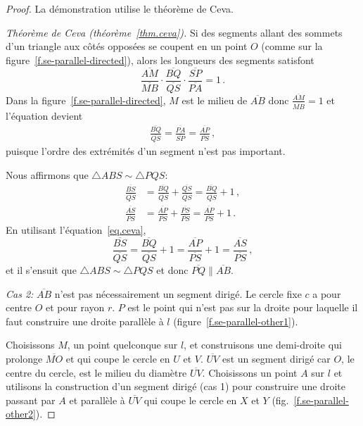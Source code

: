 \begin{proof}
La démonstration utilise le théorème de Ceva.

\textit{Théorème de Ceva   (théorème~\ref{thm.ceva}).} Si des segments  allant des sommets d'un triangle aux côtés opposées se coupent en un point $O$ (comme sur la figure~\ref{f.se-parallel-directed}), alors les longueurs des segments satisfont 
\[
\frac{\overline{AM}}{\overline{MB}}\cdot\frac{\overline{BQ}}{\overline{QS}}\cdot\frac{\overline{SP}}{\overline{PA}} = 1\,.
\]
Dans la figure~\ref{f.se-parallel-directed}, $M$ est le milieu de $\overline{AB}$ donc 
 $\displaystyle\frac{\overline{AM}}{\overline{MB}}=1$ et l'équation devient 
\begin{align}
\frac{\overline{BQ}}{\overline{QS}}=\frac{\overline{PA}}{\overline{SP}}=\frac{\overline{AP}}{\overline{PS}}\,,\label{eq.ceva}
\end{align}
puisque l'ordre des extrémités d'un segment n'est pas important.

Nous affirmons que $\triangle ABS \sim \triangle PQS$:
\begin{align*}
\frac{\overline{BS}}{\overline{QS}}&=\frac{\overline{BQ}}{\overline{QS}}+\frac{\overline{QS}}{\overline{QS}} = \frac{\overline{BQ}}{\overline{QS}}+1\,,\\
\frac{\overline{AS}}{\overline{PS}} &= \frac{\overline{AP}}{\overline{PS}} + \frac{\overline{PS}}{\overline{PS}} = \frac{\overline{AP}}{\overline{PS}} + 1\,.
\end{align*}
En utilisant l'équation~\ref{eq.ceva},
\[
\frac{\overline{BS}}{\overline{QS}}=\frac{\overline{BQ}}{\overline{QS}}+1=\frac{\overline{AP}}{\overline{PS}}+1=\frac{\overline{AS}}{\overline{PS}}\,,
\]
et il s'ensuit que $\triangle ABS \sim \triangle PQS$ et donc 
 $\overline{PQ}\parallel\overline{AB}$.

\textit{Cas 2:}
$\overline{AB}$ n'est pas nécessairement un segment  dirigé. Le cercle fixe $c$ a pour centre $O$ et pour rayon $r$. $P$ est le point qui n'est pas sur la droite pour laquelle il faut construire une droite parallèle à $l$ (figure~\ref{f.se-parallel-other1}).

Choisissons $M$, un point quelconque sur $l$, et construisons une demi-droite qui prolonge $\overline{MO}$ et qui coupe le cercle en $U$ et $V$.
$\overline{UV}$ est un segment  dirigé car $O$, le centre du cercle, est le milieu du diamètre $\overline{UV}$. Choisissons un point $A$ sur $l$ et utilisons la construction d'un segment  dirigé (cas 1) pour construire une droite passant par $A$ et parallèle à $\overline{UV}$ qui coupe le cercle en $X$ et $Y$  (fig.~\ref{f.se-parallel-other2}).


\end{proof}
